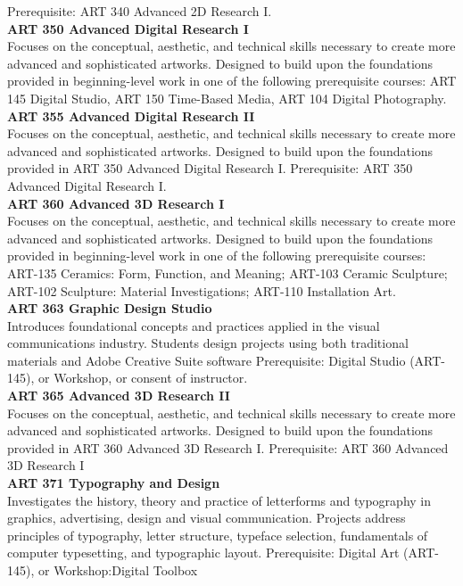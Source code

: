 \documentclass[
  letterpaper,
]{scrbook}
\begin{document}
Prerequisite: ART 340 Advanced 2D Research I.\\
\textbf{ART 350 Advanced Digital Research I}\\
Focuses on the conceptual, aesthetic, and technical skills necessary to
create more advanced and sophisticated artworks. Designed to build upon
the foundations provided in beginning-level work in one of the following
prerequisite courses: ART 145 Digital Studio, ART 150 Time-Based Media,
ART 104 Digital Photography.\\
\textbf{ART 355 Advanced Digital Research II}\\
Focuses on the conceptual, aesthetic, and technical skills necessary to
create more advanced and sophisticated artworks. Designed to build upon
the foundations provided in ART 350 Advanced Digital Research I.
Prerequisite: ART 350 Advanced Digital Research I.\\
\textbf{ART 360 Advanced 3D Research I}\\
Focuses on the conceptual, aesthetic, and technical skills necessary to
create more advanced and sophisticated artworks. Designed to build upon
the foundations provided in beginning-level work in one of the following
prerequisite courses: ART-135 Ceramics: Form, Function, and Meaning;
ART-103 Ceramic Sculpture; ART-102 Sculpture: Material Investigations;
ART-110 Installation Art.\\
\textbf{ART 363 Graphic Design Studio}\\
Introduces foundational concepts and practices applied in the visual
communications industry. Students design projects using both traditional
materials and Adobe Creative Suite software Prerequisite: Digital Studio
(ART-145), or Workshop, or consent of instructor.\\
\textbf{ART 365 Advanced 3D Research II}\\
Focuses on the conceptual, aesthetic, and technical skills necessary to
create more advanced and sophisticated artworks. Designed to build upon
the foundations provided in ART 360 Advanced 3D Research I.
Prerequisite: ART 360 Advanced 3D Research I\\
\textbf{ART 371 Typography and Design}\\
Investigates the history, theory and practice of letterforms and
typography in graphics, advertising, design and visual communication.
Projects address principles of typography, letter structure, typeface
selection, fundamentals of computer typesetting, and typographic layout.
Prerequisite: Digital Art (ART-145), or Workshop:Digital Toolbox
\end{document}
